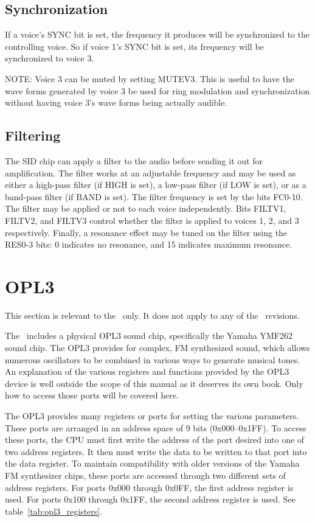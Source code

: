 \subsection*{Synchronization}

If a voice's SYNC bit is set, the frequency it produces will be synchronized to the controlling voice. So if voice 1's SYNC bit is set, its frequency will be synchronized to voice 3.

NOTE: Voice 3 can be muted by setting MUTEV3. This is useful to have the wave forms generated by voice 3 be used for ring modulation and synchronization without having voice 3's wave forms being actually audible.

\subsection*{Filtering}

The SID chip can apply a filter to the audio before sending it out for amplification. The filter works at an adjustable frequency and may be used as either a high-pass filter (if HIGH is set), a low-pass filter (if LOW is set), or as a band-pass filter (if BAND is set). The filter frequency is set by the bits FC0-10. The filter may be applied or not to each voice independently. Bits FILTV1, FILTV2, and FILTV3 control whether the filter is applied to voices 1, 2, and 3 respectively. Finally, a resonance effect may be tuned on the filter using the RES0-3 bits: 0 indicates no resonance, and 15 indicates maximum resonance.

\section*{OPL3}

\begin{note}
	This section is relevant to the \fk\ only. It does not apply to any of the \jr\ revisions.
\end{note}

The \fk\ includes a physical OPL3 sound chip, specifically the Yamaha YMF262 sound chip. The OPL3 provides for complex, FM synthesized sound, which allows numerous oscillators to be combined in various ways to generate musical tones. An explanation of the various registers and functions provided by the OPL3 device is well outside the scope of this manual as it deserves its own book. Only how to access those ports will be covered here.

The OPL3 provides many registers or ports for setting the various parameters. These ports are arranged in an address space of 9 bits (0x000--0x1FF). To access these ports, the CPU must first write the address of the port desired into one of two address registers. It then must write the data to be written to that port into the data register. To maintain compatibility with older versions of the Yamaha FM synthesizer chips, these ports are accessed through two different sets of address registers. For ports 0x000 through 0x0FF, the first address register is used. For ports 0x100 through 0x1FF, the second address register is used. See table~\ref{tab:opl3_registers}.

